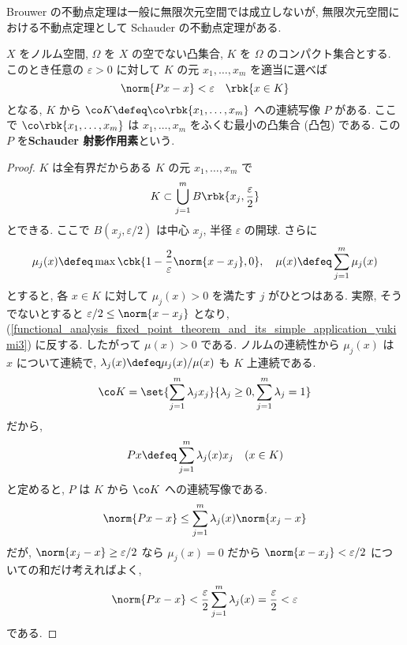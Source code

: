 \documentclass[openany, a4paper, oneside]{jsbook}
\begin{document}
Brouwer の不動点定理は一般に無限次元空間では成立しないが,
無限次元空間における不動点定理として Schauder の不動点定理がある.
\begin{lem}
 $X$ をノルム空間, $\Omega$ を $X$ の空でない凸集合,
 $K$ を $\Omega$ のコンパクト集合とする.
 このとき任意の $\varepsilon > 0$ に対して $K$ の元 $x_1, \dots , x_m$ を適当に選べば
 \begin{equation}
  \norm{Px - x}
  <
  \varepsilon \quad \rbk{x \in K}
 \end{equation}
 となる, $K$ から $\co K \defeq \co \rbk{x_1, \dots , x_m}$ への連続写像 $P$ がある.
 ここで $\co \rbk{x_1, \dots , x_m}$ は
 $x_1, \dots , x_m$ をふくむ最小の凸集合 (凸包) である.
 この $P$ を\textbf{Schauder 射影作用素}という.
\end{lem}
\begin{proof}
$K$ は全有界だからある $K$ の元 $x_1, \dots , x_m$ で
\begin{equation}\label{functional_analysis_fixed_point_theorem_and_its_simple_application_yukimi3}
 K
 \subset
 \bigcup_{j=1}^m B \rbk{x_j, \frac{\varepsilon}{2}}
\end{equation}
とできる.
ここで $B (x_j, \varepsilon / 2)$ は中心 $x_j$, 半径 $\varepsilon$ の開球.
さらに
\begin{equation}
 \mu_j(x)
 \defeq
 \max \cbk{1 - \frac{2}{\varepsilon} \norm{x - x_j}, 0}, \quad
 \mu (x)
 \defeq
 \sum_{j=1}^m \mu_j (x)
\end{equation}
とすると, 各 $x \in K$ に対して $\mu_j (x) > 0$ を満たす $j$ がひとつはある.
実際, そうでないとすると $\varepsilon / 2 \le \norm{x - x_j}$ となり,
(\ref{functional_analysis_fixed_point_theorem_and_its_simple_application_yukimi3}) に反する.
したがって $\mu (x) > 0$ である.
ノルムの連続性から $\mu_j (x)$ は $x$ について連続で,
$\lambda_j (x) \defeq \mu_j (x) / {\mu (x)}$ も $K$ 上連続である.
\begin{align}
 \co K
 =
 \set{\sum_{j=1}^m \lambda_j x_j}{\lambda_j \ge 0, \sum_{j=1}^m \lambda_j = 1}
\end{align}
だから,
\begin{equation}
 Px
 \defeq
 \sum_{j=1}^m \lambda_j (x) x_j \quad (x \in K)
\end{equation}
と定めると, $P$ は $K$ から $\co K$ への連続写像である.
\begin{equation}
 \norm{Px - x}
 \le
 \sum_{j=1}^m \lambda_j (x) \norm{x_j - x}
\end{equation}
だが,  $\norm{x_j - x} \ge \varepsilon / 2$ なら $\mu_j (x) = 0$ だから $\norm{x - x_j} < \varepsilon / 2$ についての和だけ考えればよく,
\begin{equation}
 \norm{Px - x}
 <
 \frac{\varepsilon}{2} \sum_{j=1}^m \lambda_j (x)
 =
 \frac{\varepsilon} {2}
 < \varepsilon
\end{equation}
である.
\end{proof}
\end{document}
